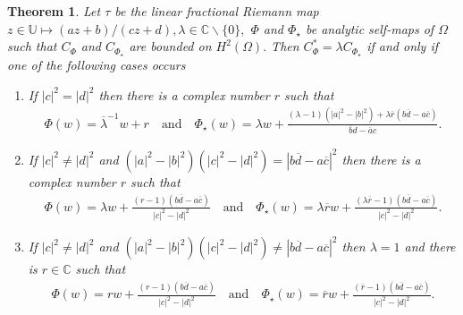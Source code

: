 \documentclass[11pt]{amsart}%
\newtheorem{thm}{Theorem}[section]
\theoremstyle{definition}
\theoremstyle{remark}
\numberwithin{equation}{section}
\begin{document}
\begin{thm}
\label{038} Let $\tau$ be the linear fractional Riemann map $z\in \mathbb{U} \mapsto (az+b)/(cz+d),\lambda \in \mathbb{C}\backslash\{0\},$ $\Phi$ and $\Phi_{\star}$ be analytic self-maps of $\Omega$
such that $C_{\Phi}$ and $C_{\Phi_{\star}}$ are bounded on $H^{2}(\Omega).$ Then
$C_{\Phi}^{\ast}=\lambda C_{\Phi_{\star}}$ if and only if one of the following cases occurs

\begin{enumerate}
\item If $|c|^{2}=|d|^{2}$ then there is a complex number $r$ such that
\begin{align}\label{035}
\Phi(w)=\overline{\lambda}^{-1}w+r\quad\text{and}\quad\Phi_{\star}(w)=\lambda
w+\frac{(\lambda-1)(|a|^{2}-|b|^{2})+\lambda\overline{r}(b\overline
{d}-a\overline{c})}{\overline{b}d-\overline{a}c}.
\end{align}


\item If $|c|^{2}\neq|d|^{2}$ and $(|a|^{2}-|b|^{2})(|c|^{2}-|d|^{2}%
)=|b\overline{d}-a\overline{c}|^{2}$ then there is a complex number $r$ such
that%
\begin{align}\label{036}
\Phi(w)=\lambda w+\frac{(r-1)(b\overline{d}-a\overline{c})}{|c|^{2}-|d|^{2}}%
\quad\text{and}\quad\Phi_{\star}(w)=\lambda \overline{r}w+\frac{(\lambda
\overline{r}-1)(b\overline{d}-a\overline{c})}{|c|^{2}-|d|^{2}}.
\end{align}


\item If $|c|^{2}\neq|d|^{2}$ and $(|a|^{2}-|b|^{2})(|c|^{2}-|d|^{2}%
)\neq|b\overline{d}-a\overline{c}|^{2}$ then $\lambda=1$ and there is
$r\in\mathbb{C}$ such that%
\begin{align}\label{043}
\Phi(w)=rw+\frac{(r-1)(b\overline{d}-a\overline{c})}{|c|^{2}-|d|^{2}}%
\quad\text{and}\quad\Phi_{\star}(w)=\overline{r}w+\frac{(\overline
{r}-1)(b\overline{d}-a\overline{c})}{|c|^{2}-|d|^{2}}.
\end{align}

\end{enumerate}
\end{thm}
\end{document}
